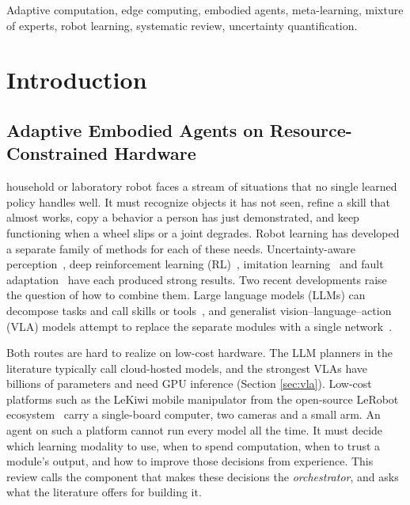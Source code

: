 \documentclass[journal]{IEEEtran}
\begin{document}
\begin{IEEEkeywords}
Adaptive computation, edge computing, embodied agents, meta-learning, mixture of experts, robot learning, systematic review, uncertainty quantification.
\end{IEEEkeywords}


\section{Introduction}\label{sec:intro}

\subsection{Adaptive Embodied Agents on Resource-Constrained Hardware}\label{sec:problem}
 household or laboratory robot faces a stream of situations that no single learned policy handles well. It must recognize objects it has not seen, refine a skill that almost works, copy a behavior a person has just demonstrated, and keep functioning when a wheel slips or a joint degrades. Robot learning has developed a separate family of methods for each of these needs. Uncertainty-aware perception~\cite{Gal2016,Kendall2017}, deep reinforcement learning (RL)~\cite{Haarnoja2018,Schulman2017}, imitation learning~\cite{Chi2023,Zhao2023} and fault adaptation~\cite{Cully2015,Kumar2021} have each produced strong results. Two recent developments raise the question of how to combine them. Large language models (LLMs) can decompose tasks and call skills or tools~\cite{Ahn2022,Yao2023a,Schick2023}, and generalist vision--language--action (VLA) models attempt to replace the separate modules with a single network~\cite{Brohan2023b,Kim2024,Black2024}.

Both routes are hard to realize on low-cost hardware. The LLM planners in the literature typically call cloud-hosted models, and the strongest VLAs have billions of parameters and need GPU inference (Section \ref{sec:vla}). Low-cost platforms such as the LeKiwi mobile manipulator from the open-source LeRobot ecosystem~\cite{Cadene2026,Cadene2024} carry a single-board computer, two cameras and a small arm. An agent on such a platform cannot run every model all the time. It must decide which learning modality to use, when to spend computation, when to trust a module's output, and how to improve those decisions from experience. This review calls the component that makes these decisions the \emph{orchestrator}, and asks what the literature offers for building it.
\end{document}
